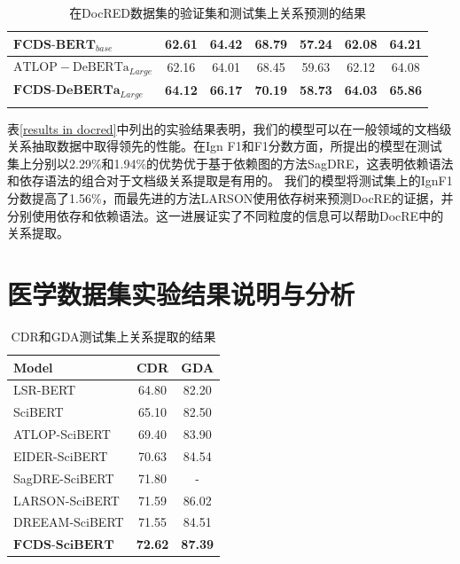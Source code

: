 \documentclass[bachelor]{thesis-uestc}
\begin{document}
\begin{table}
\begin{tabular}{@{}llllcccccc@{}}
    \multicolumn{4}{l}{$\mathrm{\textbf{FCDS-BERT}}_{base}$}              & \textbf{62.61} & \textbf{64.42} & \textbf{68.79}    & \textbf{57.24}    & \textbf{62.08}       & \textbf{64.21}      \\ \midrule
    \multicolumn{4}{l}{$\mathrm{ATLOP-DeBERTa}_{Large}$\cite{zhou2021document}}          & 62.16 & 64.01 & 68.45        & 59.63        & 62.12       & 64.08      \\
    \multicolumn{4}{l}{$\mathrm{\textbf{FCDS-DeBERTa}}_{Large}$}           & \textbf{64.12} & \textbf{66.17} & \textbf{70.19}        & \textbf{58.73}        & \textbf{64.03}       & \textbf{65.86}    \\ \midrule \\
    \end{tabular}
    \caption{在DocRED数据集的验证集和测试集上关系预测的结果}
\end{table}\label{results in docred}

表\ref{results in docred}中列出的实验结果表明，我们的模型可以在一般领域的文档级关系抽取数据中取得领先的性能。在Ign F1和F1分数方面，所提出的模型在测试集上分别以2.29\%和1.94\%的优势优于基于依赖图的方法SagDRE\cite{SagDRE}，这表明依赖语法和依存语法的组合对于文档级关系提取是有用的。
我们的模型将测试集上的IgnF1分数提高了1.56\%，而最先进的方法LARSON\cite{duan-etal-2022-just}使用依存树来预测DocRE的证据，并分别使用依存和依赖语法。这一进展证实了不同粒度的信息可以帮助DocRE中的关系提取。\par

\section{医学数据集实验结果说明与分析}\label{sec:medical}

\begin{table}[]
    \centering 
    \begin{tabular}{lcc}
    \hline
    Model          & CDR            & GDA            \\ \hline
    LSR-BERT\cite{nan-etal-2020-reasoning}       & 64.80           & 82.20           \\
    SciBERT\cite{zhou2021document}        & 65.10           & 82.50           \\
    ATLOP-SciBERT\cite{zhou2021document}  & 69.40           & 83.90           \\
    EIDER-SciBERT\cite{xie2022eider}  & 70.63          & 84.54          \\
    SagDRE-SciBERT\cite{SagDRE} & 71.80          & -              \\ 
    LARSON-SciBERT\cite{duan-etal-2022-just} & 71.59          & 86.02              \\ 
    DREEAM-SciBERT\cite{ma-etal-2023-DREEAM} & 71.55          & 84.51              \\ 
    $\mathrm{\textbf{FCDS-SciBERT}}$           & \textbf{72.62} & \textbf{87.39} \\ \hline
    \end{tabular}
    \caption{CDR和GDA测试集上关系提取的结果}
\end{table}\label{CDR/GDA}
\end{document}
